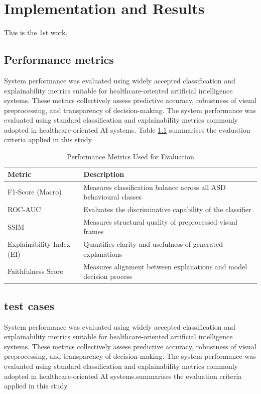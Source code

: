 \chapter{Implementation and Results}
This is the 1st work.
\section{Performance metrics}
System performance was evaluated using widely accepted classification and
explainability metrics suitable for healthcare-oriented artificial intelligence
systems. These metrics collectively assess predictive accuracy, robustness of
visual preprocessing, and transparency of decision-making.
The system performance was evaluated using standard classification and
explainability metrics commonly adopted in healthcare-oriented AI
systems. Table \ref{tab:performance_metrics} summarises the evaluation
criteria applied in this study.
\begin{table}[h]
\centering
\begin{tabular}{|l|p{9cm}|}
\hline
\textbf{Metric} & \textbf{Description} \\ \hline
F1-Score (Macro) & Measures classification balance across all ASD behavioural classes \\ \hline
ROC-AUC & Evaluates the discriminative capability of the classifier \\ \hline
SSIM & Measures structural quality of preprocessed visual frames \\ \hline
Explainability Index (EI) & Quantifies clarity and usefulness of generated explanations \\ \hline
Faithfulness Score & Measures alignment between explanations and model decision process \\ \hline
\end{tabular}
\caption{Performance Metrics Used for Evaluation}
\label{tab:performance_metrics}
\end{table}

\section{test cases}
System performance was evaluated using widely accepted classification and
explainability metrics suitable for healthcare-oriented artificial intelligence
systems. These metrics collectively assess predictive accuracy, robustness of
visual preprocessing, and transparency of decision-making.
The system performance was evaluated using standard classification and
explainability metrics commonly adopted in healthcare-oriented AI
systems.summarises the evaluation
criteria applied in this study.


